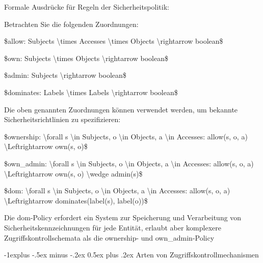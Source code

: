 \documentclass[a4paper]{article}
\makeatletter
\renewcommand{\subsection}{\@startsection{subsection}{2}{0mm}%
 {-1explus -.5ex minus -.2ex}%
 {0.5ex plus .2ex}%
 {\normalfont\normalsize\bfseries}}
\makeatother
\begin{document}
\begin{multicols}{3}
      \begin{itemize*}
            \item Formale Ausdrücke für Regeln der Sicherheitspolitik:
            \item Betrachten Sie die folgenden Zuordnungen:
            \begin{itemize*}
                  \item \$allow: Subjects \textbackslash times Accesses \textbackslash times Objects \textbackslash rightarrow boolean\$
                  \item \$own: Subjects \textbackslash times Objects \textbackslash rightarrow boolean\$
                  \item \$admin: Subjects \textbackslash rightarrow boolean\$
                  \item \$dominates: Labels \textbackslash times Labels \textbackslash rightarrow boolean\$
            \end{itemize*}
            \item Die oben genannten Zuordnungen können verwendet werden, um bekannte
            Sicherheitsrichtlinien zu spezifizieren:
            \begin{itemize*}
                  \item \$ownership: \textbackslash forall s \textbackslash in Subjects, o \textbackslash in Objects, a \textbackslash in Accesses: allow(s, o, a) \textbackslash Leftrightarrow own(s, o)\$
                  \item \$own\_admin: \textbackslash forall s \textbackslash in Subjects, o \textbackslash in Objects, a \textbackslash in Accesses: allow(s, o, a) \textbackslash Leftrightarrow own(s, o) \textbackslash wedge admin(s)\$
                  \item \$dom: \textbackslash forall s \textbackslash in Subjects, o \textbackslash in Objects, a \textbackslash in Accesses: allow(s, o, a) \textbackslash Leftrightarrow dominates(label(s), label(o))\$
            \end{itemize*}
            \item Die dom-Policy erfordert ein System zur Speicherung und Verarbeitung
            von Sicherheitskennzeichnungen für jede Entität, erlaubt aber
            komplexere Zugriffskontrollschemata als die ownership- und
            own\_admin-Policy
      \end{itemize*}


      \subsection{Arten von
            Zugriffskontrollmechanismen}


\end{multicols}
\end{document}
